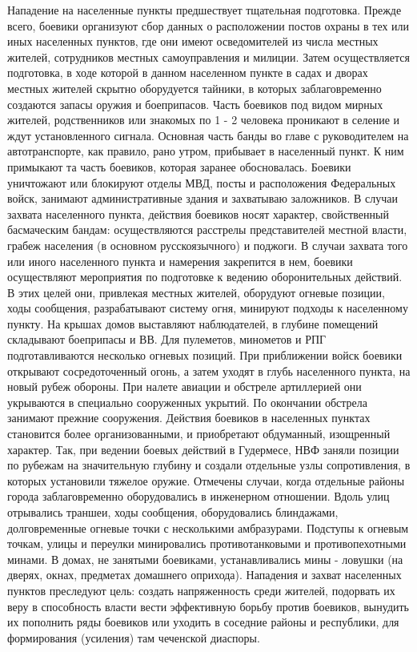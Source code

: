\documentclass[12pt,a4paper]{report}
\begin{document}
Нападение на населенные пункты предшествует тщательная подготовка. Прежде всего, боевики организуют сбор данных о расположении постов охраны в тех или иных населенных пунктов, где они имеют осведомителей из числа местных жителей, сотрудников местных самоуправления и милиции. Затем осуществляется подготовка, в ходе которой в данном населенном пункте в садах и дворах местных жителей скрытно оборудуется тайники, в которых заблаговременно создаются запасы оружия и боеприпасов. Часть боевиков под видом мирных жителей, родственников или знакомых по 1 - 2 человека проникают в селение и ждут установленного сигнала. Основная часть банды во главе с руководителем на автотранспорте, как правило, рано утром, прибывает в населенный пункт. К ним примыкают та часть боевиков, которая заранее обосновалась. Боевики уничтожают или блокируют отделы МВД, посты и расположения Федеральных войск, занимают административные здания и захватываю заложников. В случаи захвата населенного пункта, действия боевиков носят характер, свойственный басмаческим бандам: осуществляются расстрелы представителей местной власти, грабеж населения (в основном русскоязычного) и поджоги. В случаи захвата того или иного населенного пункта и намерения закрепится в нем, боевики осуществляют мероприятия по подготовке к ведению оборонительных действий. В этих целей они, привлекая местных жителей, оборудуют огневые позиции, ходы сообщения, разрабатывают систему огня, минируют подходы к населенному пункту. На крышах домов выставляют наблюдателей, в глубине помещений складывают боеприпасы и ВВ. Для пулеметов, минометов и РПГ подготавливаются несколько огневых позиций. При приближении войск боевики открывают сосредоточенный огонь, а затем уходят в глубь населенного пункта, на новый рубеж обороны. При налете авиации и обстреле артиллерией они укрываются в специально сооруженных укрытий. По окончании обстрела занимают прежние сооружения. Действия боевиков в населенных пунктах становится более организованными, и приобретают обдуманный, изощренный характер. Так, при ведении боевых действий в Гудермесе, НВФ заняли позиции по рубежам на значительную глубину и создали отдельные узлы сопротивления, в которых установили тяжелое оружие. Отмечены случаи, когда отдельные районы города заблаговременно оборудовались в инженерном отношении. Вдоль улиц отрывались траншеи, ходы сообщения, оборудовались блиндажами, долговременные огневые точки с несколькими амбразурами. Подступы к огневым точкам, улицы и переулки минировались противотанковыми и противопехотными минами. В домах, не занятыми боевиками, устанавливались мины - ловушки (на дверях, окнах, предметах домашнего оприхода). Нападения и захват населенных пунктов преследуют цель: создать напряженность среди жителей, подорвать их веру в способность власти вести эффективную борьбу против боевиков, вынудить их пополнить ряды боевиков или уходить в соседние районы и республики, для формирования (усиления) там чеченской диаспоры. 
\end{document}
